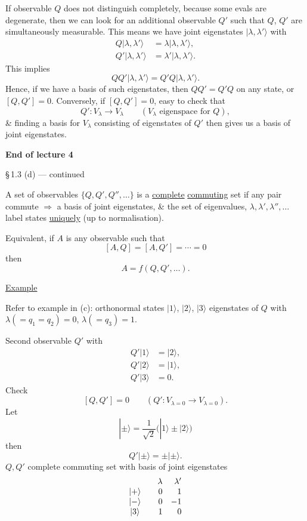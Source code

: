 \documentclass[11pt,a4paper]{article}
\begin{document}
If observable $Q$ does not distinguish completely, because some evals
are degenerate, then we can look for an additional observable $Q'$
such that $Q$, $Q'$ are simultaneously measurable.
This means we have joint eigenstates $|\lambda,\lambda'\rangle$ with
\begin{align*}
    Q|\lambda,\lambda'\rangle&=\lambda|\lambda,\lambda'\rangle,\\
    Q'|\lambda,\lambda'\rangle&=\lambda'|\lambda,\lambda'\rangle.
\end{align*}
This implies
\[
    QQ'|\lambda,\lambda'\rangle=Q'Q|\lambda,\lambda'\rangle.
\]
Hence, if we have a basis of such eigenstates, then $QQ'=Q'Q$ on any
state, or $[Q,Q']=0$.
Conversely, if $[Q,Q']=0$, easy to check that
\[
    Q':V_\lambda\to V_\lambda
    \qquad(V_\lambda\text{ eigenspace for }Q),
\]
\& finding a basis for $V_\lambda$ consisting of eigenstates of $Q'$
then gives us a basis of joint eigenstates.

\begin{center}
    \textbf{End of lecture 4}
\end{center}

\noindent
\S\,1.3 (d) --- continued

A set of observables $\{Q,Q',Q'',\ldots\}$ is a \underline{complete}
\underline{commuting} set if any pair commute $\Rightarrow$ a basis of joint
eigenstates, \& the set of eigenvalues, $\lambda,\lambda',\lambda'',\ldots$
label states \underline{uniquely} (up to normalisation).

Equivalent, if $A$ is any observable such that
\[
    [A,Q]=[A,Q']=\cdots=0
\]
then
\[
    A=f(Q,Q',\ldots).
\]

\noindent
\underline{Example}

Refer to example in (c): orthonormal states $|1\rangle$, $|2\rangle$, $|3\rangle$
eigenstates of $Q$ with $\lambda(=q_1=q_2)=0$, $\lambda(=q_3)=1$.

Second observable $Q'$ with
\[
    \begin{aligned}
        Q'|1\rangle&=|2\rangle,\\
        Q'|2\rangle&=|1\rangle,\\
        Q'|3\rangle&=0.
    \end{aligned}
\]
Check
\[
    [Q,Q']=0
    \qquad (Q':V_{\lambda=0}\to V_{\lambda=0}).
\]
Let
\[
    |\pm\rangle=\frac{1}{\sqrt{2}}\bigl(|1\rangle\pm|2\rangle\bigr)
\]
then
\[
    Q'|\pm\rangle=\pm|\pm\rangle.
\]
$Q,Q'$ complete commuting set with basis of joint eigenstates
\[
    \begin{array}{c@{\qquad}rr}
        &\lambda&\lambda'\\
        |+\rangle&0&1\\
        |-\rangle&0&-1\\
        |3\rangle&1&0
    \end{array}
\]
\end{document}
